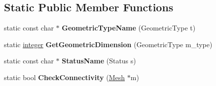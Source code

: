 \subsection*{Static Public Member Functions}
\begin{DoxyCompactItemize}
\item 
\hypertarget{classINMOST_1_1Element_a0a1993360a4b2767e808db24905f660c}{static const char $\ast$ {\bfseries Geometric\-Type\-Name} (Geometric\-Type t)}\label{classINMOST_1_1Element_a0a1993360a4b2767e808db24905f660c}

\item 
\hypertarget{classINMOST_1_1Element_a68fb90367eb06a63b69bb3059733d110}{static \hyperlink{classINMOST_1_1Storage_aec96942bc647417a801e2895b45964d2}{integer} {\bfseries Get\-Geometric\-Dimension} (Geometric\-Type m\-\_\-type)}\label{classINMOST_1_1Element_a68fb90367eb06a63b69bb3059733d110}

\item 
\hypertarget{classINMOST_1_1Element_a6d81cab77a57f33fb614505c21767841}{static const char $\ast$ {\bfseries Status\-Name} (Status s)}\label{classINMOST_1_1Element_a6d81cab77a57f33fb614505c21767841}

\item 
\hypertarget{classINMOST_1_1Element_acedd520621e7c5da55d1b17ccb671aa8}{static bool {\bfseries Check\-Connectivity} (\hyperlink{classINMOST_1_1Mesh}{Mesh} $\ast$m)}\label{classINMOST_1_1Element_acedd520621e7c5da55d1b17ccb671aa8}

\end{DoxyCompactItemize}
